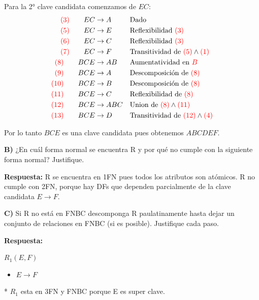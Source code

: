 \documentclass{templateNote}
\begin{document}
\begin{enumerate}
    \hrulefill

    Para la 2° clave candidata comenzamos de $EC$:
    \begin{align*}
        \textcolor{red}{(3)} \qquad EC &\rightarrow A && \text{Dado} \\
        \textcolor{red}{(5)} \qquad EC &\rightarrow E && \text{Reflexibilidad } \textcolor{red}{(3)} \\
        \textcolor{red}{(6)} \qquad EC &\rightarrow C && \text{Reflexibilidad } \textcolor{red}{(3)} \\
        \textcolor{red}{(7)} \qquad EC &\rightarrow F && \text{Transitividad de } \textcolor{red}{(5)} \wedge \textcolor{red}{(1)} \\
        \textcolor{red}{(8)} \qquad BCE &\rightarrow AB && \text{Aumentatividad en } \textcolor{red}{B} \\
        \textcolor{red}{(9)} \qquad BCE &\rightarrow A && \text{Descomposición de } \textcolor{red}{(8)} \\
        \textcolor{red}{(10)} \qquad BCE &\rightarrow B && \text{Descomposición de } \textcolor{red}{(8)} \\
        \textcolor{red}{(11)} \qquad BCE &\rightarrow C && \text{Reflexibilidad de } \textcolor{red}{(8)} \\
        \textcolor{red}{(12)} \qquad BCE &\rightarrow ABC && \text{Union de } \textcolor{red}{(8)} \wedge \textcolor{red}{(11)}\\
        \textcolor{red}{(13)} \qquad BCE &\rightarrow D && \text{Transitividad de } \textcolor{red}{(12)} \wedge \textcolor{red}{(4)}\\
    \end{align*}
    
    Por lo tanto $BCE$ es una clave candidata pues obtenemos $ABCDEF$.
    
    \newpage
    \textbf{B)} ¿En cuál forma normal se encuentra R y por qué no cumple con la siguiente forma normal? Justifique.

    \textbf{Respuesta:} R se encuentra en 1FN pues todos los atributos son atómicos. R no cumple con 2FN, porque hay DFs que dependen parcialmente de la clave candidata $E \rightarrow F$.
    
    \textbf{C)} Si R no está en FNBC descomponga R paulatinamente hasta dejar un conjunto de relaciones en FNBC (si es posible). Justifique cada paso.

    \textbf{Respuesta:} 
    
    $R_1 (E,F)$ 
    \begin{itemize}
        \item $E \rightarrow F$
    \end{itemize}
    * $R_1$ esta en 3FN y FNBC porque E es super clave.


\end{enumerate}
\end{document}
